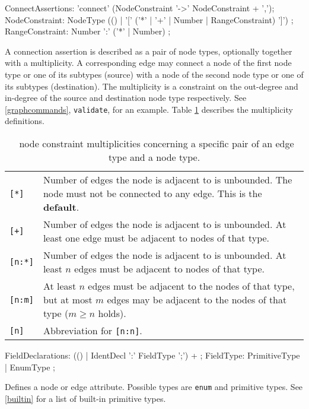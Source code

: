 \begin{rail}  
  ConnectAssertions: 'connect' (NodeConstraint '->' NodeConstraint + ',');
  NodeConstraint: NodeType (() | '[' ('*' | '+' | Number | RangeConstraint) ']') ;
  RangeConstraint: Number ':' ('*' | Number) ;
\end{rail}
A connection assertion is described as a pair of node types, optionally together with a multiplicity. A corresponding edge may connect a node of the first node type or one of its subtypes (source) with a node of the second node type or one of its subtypes (destination). The multiplicity is a constraint on the out-degree and in-degree of the source and destination node type respectively. See \ref{graphcommands}, \texttt{validate}, for an example. Table \ref{multiplicities} describes the multiplicity definitions.
\begin{table}[htbp]
\begin{tabularx}{\linewidth}{|l|X|}\hline
	\texttt{[*]} & Number of edges the node is adjacent to is unbounded. The node must not be connected to any edge. This is the \textbf{default}.\\
	\texttt{[+]} & Number of edges the node is adjacent to is unbounded. At least one edge must be adjacent to nodes of that type.\\
	\texttt{[n:*]} & Number of edges the node is adjacent to is unbounded. At least $n$ edges must be adjacent to nodes of that type.\\ 
	\texttt{[n:m]} & At least $n$ edges must be adjacent to the nodes of that type, but at most $m$ edges may be adjacent to the nodes of that type ($m \geq n$ holds).\\
	\texttt{[n]} & Abbreviation for \texttt{[n:n]}. \\ \hline
\end{tabularx}
\caption{\GrG\ node constraint multiplicities concerning a specific pair of an edge type and a node type.}
\label{multiplicities}
\end{table}

\begin{rail}    
  FieldDeclarations: (() | IdentDecl ':' FieldType ';') + ;
  FieldType: PrimitiveType | EnumType ; 
\end{rail}
Defines a node or edge attribute. Possible types are \texttt{enum} and primitive types. See \ref{builtin} for a list of built-in primitive types.

